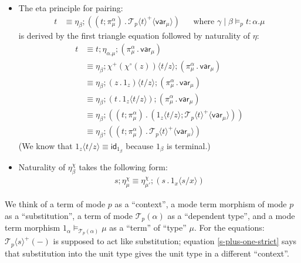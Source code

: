 \documentclass[10pt]{article}
\theoremstyle{definition}
\newcommand\dsd[1]{\ensuremath{\mathsf{#1}}}
\newcommand{\Yields}{\vDash}
\newcommand\TermTwoT[5]{\ensuremath{#1 \mid #3 \vDash_{#5} #2 : #4}}
\newcommand\TrPlus[2]{\ensuremath{{#1}^+(#2)}}
\newcommand\TrCirc[2]{\ensuremath{{#1}^\circ(#2)}}
\newcommand\var[1]{\ensuremath{\mathsf{var}_{#1}}}
\newcommand{\id}{\mathsf{id}}
\newcommand\El[2]{\mathcal{T}_{#1}(#2)}
\newcommand\ApEl[2]{\mathcal{T}_{#1}\langle#2\rangle}
\newcommand\ap[2]{\ensuremath{#1 \langle #2 \rangle }}
\newcommand\ApPlus[2]{\ensuremath{{#1}^+ \langle #2 \rangle }}
\newcommand\ApCirc[2]{\ensuremath{{#1}^\circ \langle #2 \rangle }}
\newcommand{\app}[2]{\ensuremath{#1 \: #2}}
\newcommand{\fst}[1]{\app{\dsd{fst}}{#1}}
\newcommand\bdot[0]{\mathbin{.}}
\begin{document}
\begin{itemize}
\item The eta principle for pairing:
\begin{align}
\label{eta-pi-var}
t &\equiv \eta_\beta;((t;\pi^\alpha_\mu) \bdot \ApPlus{\ApEl{p}{t}}{\var{\mu}}) && \text{where } \TermTwoT{\gamma}{t}{\beta}{\alpha.\mu}{p}
\end{align}
is derived by the first triangle equation followed by naturality of $\eta$:
\begin{align*}
t &\equiv t;\eta_{\alpha.\mu};(\pi_\mu^\alpha \bdot \var{\mu}) \\
&\equiv \eta_\beta;\ap{\TrPlus{\chi}{\TrCirc{\chi}{z}}}{t/z};(\pi_\mu^\alpha \bdot \var{\mu}) \\
&\equiv \eta_\beta;\ap{(z \bdot 1_z)}{t/z};(\pi_\mu^\alpha \bdot \var{\mu}) \\
&\equiv \eta_\beta;(t \bdot \ap{1_z}{t/z});(\pi_\mu^\alpha \bdot \var{\mu}) \\
&\equiv \eta_\beta;((t;\pi_\mu^\alpha) \bdot (\ap{1_z}{t/z}; \ApPlus{\ApEl{p}{t}}{\var{\mu}})) \\
&\equiv \eta_\beta;((t;\pi_\mu^\alpha) \bdot \ApPlus{\ApEl{p}{t}}{\var{\mu}})
\end{align*}
(We know that $\ap{1_z}{t/z} \equiv \id_{1_\beta}$ because $1_\beta$ is terminal.)

\item Naturality of $\eta^\chi_\beta$ takes the following form:
\begin{align*}
s;\eta^\chi_\mu \equiv \eta^\chi_{\mu'} ; (s \bdot \ap{1_x}{s/x})
\end{align*}

\end{itemize}

We think of a term of mode $p$ as a ``context'', a mode term morphism of
mode $p$ as a ``substitution'', a term of mode $\El{p}{\alpha}$ as a
``dependent type'', and a mode term morphism $1_\alpha
\Yields_{\El{p}{\alpha}} \mu$ as a ``term'' of ``type'' $\mu$.  For the
equations: $\TrPlus{\ApEl{p}{s}}{-}$ is supposed to act like
substitution; equation \eqref{s-plus-one-strict} says that substitution
into the unit type gives the unit type in a different ``context''.
\end{document}
